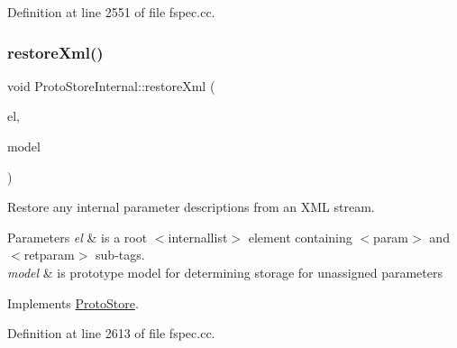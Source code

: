 Definition at line 2551 of file fspec.\+cc.

\mbox{\label{class_proto_store_internal_ae1c3cd409eda277f1ff924cf858eddef}} 
\subsubsection{\texorpdfstring{restoreXml()}{restoreXml()}}
{\footnotesize\ttfamily void Proto\+Store\+Internal\+::restore\+Xml (\begin{DoxyParamCaption}\item[{const \mbox{\hyperlink{class_element}{Element}} $\ast$}]{el,  }\item[{\mbox{\hyperlink{class_proto_model}{Proto\+Model}} $\ast$}]{model }\end{DoxyParamCaption})\hspace{0.3cm}{\ttfamily [virtual]}}



Restore any internal parameter descriptions from an X\+ML stream. 


\begin{DoxyParams}{Parameters}
{\em el} & is a root $<$internallist$>$ element containing $<$param$>$ and $<$retparam$>$ sub-\/tags. \\
\hline
{\em model} & is prototype model for determining storage for unassigned parameters \\
\hline
\end{DoxyParams}


Implements \mbox{\hyperlink{class_proto_store_a7311214c33205be191361836d716f99b}{Proto\+Store}}.



Definition at line 2613 of file fspec.\+cc.

